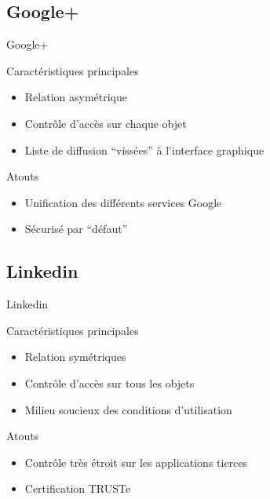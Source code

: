 \subsection{Google+}
\begin{frame}{Google+}

\begin{block}{Caractéristiques principales}
\begin{itemize}
\item Relation asymétrique
\item Contrôle d'accès sur chaque objet
\item Liste de diffusion ``vissées'' à l'interface graphique
\end{itemize}
\end{block}


\begin{block}{Atouts}
\begin{itemize}
\item Unification des différents services Google
\item Sécurisé par ``défaut''
\end{itemize}
\end{block}

\end{frame}

\subsection{Linkedin}
\begin{frame}{Linkedin}
\begin{block}{Caractéristiques principales}
\begin{itemize}
\item Relation symétriques
\item Contrôle d'accès sur tous les objets
\item Milieu soucieux des conditions d'utilisation
\end{itemize}
\end{block}

\begin{block}{Atouts}
\begin{itemize}
\item Contrôle très étroit sur les applications tierces
\item Certification TRUSTe
\end{itemize}
\end{block}

\end{frame}

